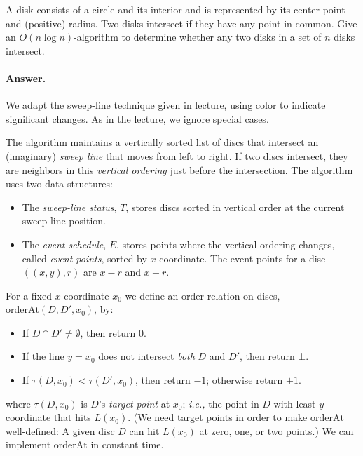 \documentclass[a4paper]{article}
\newcommand{\ie}{\emph{i.e.,} }
\begin{document}
A disk consists of a circle and its interior and is represented by its center point and (positive) radius. Two disks intersect if they have any point in common. Give an $O(n \log n)$-algorithm to determine whether any two disks in a set of $n$ disks intersect.

\paragraph{Answer.}
\newcommand{\CHANGE}{\color{red}}%
\newcommand{\orderAt}{\text{orderAt}}%
\newcommand{\Tinsert}{\text{insert}}%
\newcommand{\Tremove}{\text{remove}}%
\newcommand{\Tabove}{\text{above}}%
\newcommand{\Tbelow}{\text{below}}%
\newcommand{\sep}{\mathrel{\#}}%
\newcommand{\IF}{\mathrel{\text{if}}}%
\newcommand{\OR}{\mathrel{\text{or}}}%
\newcommand{\AND}{\mathrel{\text{and}}}%
\newcommand{\intersect}{\text{intersect}}%
\newcommand{\targ}{\tau}%
We adapt the sweep-line technique given in lecture, {\CHANGE using color to indicate significant changes.}
As in the lecture, we ignore special cases.

The algorithm maintains a vertically sorted list of discs that intersect an (imaginary) \emph{sweep line} that moves from left to right.
If two discs intersect, they are neighbors in this \emph{vertical ordering} just before the intersection.
The algorithm uses two data structures:
\begin{itemize}

\item The \emph{sweep-line status}, $T$, stores discs sorted in vertical order at the current sweep-line position.

\item The \emph{event schedule}, $E$, stores points where the vertical ordering changes, called \emph{event points}, sorted by $x$-coordinate.
{\CHANGE The event points for a disc $((x,y), r)$ are $x-r$ and $x+r$.}

\end{itemize}
For a fixed $x$-coordinate $x_0$ we define an order relation on discs, $\orderAt(D, D', x_0)$, by:
\begin{itemize}
	\item If $D \cap D' \not= \emptyset$, then return $0$.

	\item If the line $y = x_0$ does not intersect \emph{both} $D$ and $D'$, then return $\bot$.
	
	\item {\CHANGE If $\targ(D, x_0) < \targ(D', x_0)$, then return $-1$; otherwise return $+1$.}
\end{itemize}
{\CHANGE
	where $\targ(D, x_0)$ is $D$'s \emph{target point} at $x_0$; \ie the point in $D$ with least $y$-coordinate that hits $L(x_0)$.
	(We need target points in order to make $\orderAt$ well-defined:
	A given disc $D$ can hit $L(x_0)$ at zero, one, or two points.)}
We can implement $\orderAt$ in constant time.
\end{document}
